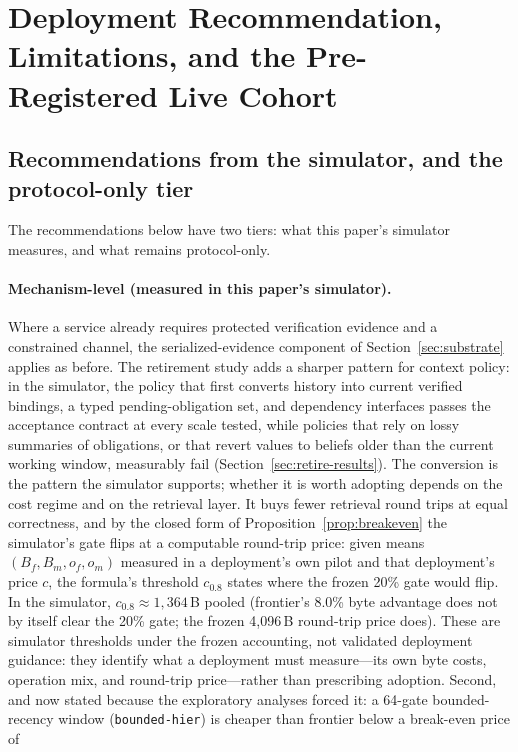 \section{Deployment Recommendation, Limitations, and the Pre-Registered Live Cohort}\label{sec:discussion}
\subsection{Recommendations from the simulator, and the protocol-only tier}\label{sec:deploy}
The recommendations below have two tiers: what this paper's simulator
measures, and what remains protocol-only.

\paragraph{Mechanism-level (measured in this paper's simulator).}
Where a service already requires protected verification evidence and a
constrained channel, the serialized-evidence component of
Section~\ref{sec:substrate} applies as before. The
retirement study adds a sharper pattern for context policy: in the
simulator, the policy that first converts history into current
verified bindings, a typed pending-obligation set, and dependency
interfaces passes the acceptance contract at every scale tested,
while policies that rely on lossy summaries of obligations, or that
revert values to beliefs older than the current working window,
measurably fail (Section~\ref{sec:retire-results}). The
conversion is the pattern the simulator supports; whether it is worth
adopting depends on the
cost regime and on the retrieval layer. It buys \RetwoOpsReduction{}
fewer retrieval round trips at equal correctness, and by the closed
form of Proposition~\ref{prop:breakeven} the simulator's gate flips
at a computable round-trip price: given means
$(B_f,B_m,o_f,o_m)$ measured in a deployment's own pilot and that
deployment's price $c$, the formula's threshold $c_{0.8}$ states
where the frozen 20\% gate would flip. In the simulator,
$c_{0.8}\approx1{,}364$\,B pooled (frontier's 8.0\% byte advantage
does not by itself clear the 20\% gate; the frozen 4{,}096\,B
round-trip price does). These are simulator thresholds under the
frozen accounting, not validated deployment guidance: they identify
what a deployment must measure---its own byte costs, operation mix,
and round-trip price---rather than prescribing adoption.
Second, and now stated because the exploratory analyses forced it: a
64-gate bounded-recency window (\texttt{bounded-hier}) is cheaper
than frontier below a break-even price of
